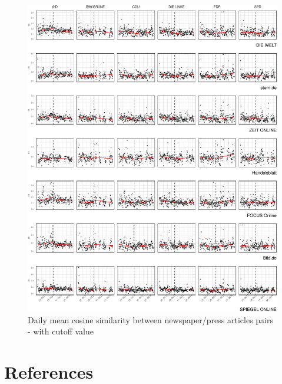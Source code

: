 \documentclass[
  12pt,
]{article}
\begin{document}
\begin{figure}

{\centering \includegraphics[width=1\linewidth]{chap1_files/figure-latex/Daily mean cosine similarity - cutoff value-1} 

}

\caption{Daily mean cosine similarity between newspaper/press articles pairs - with cutoff value \label{fig:mean_cosine_sim_rd}}\label{fig:Daily mean cosine similarity - cutoff value}
\end{figure}

\newpage

\hypertarget{references}{%
\section*{References}\label{references}}
\end{document}
